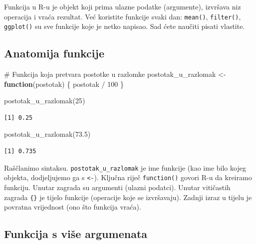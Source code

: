 \documentclass[
  croatian,
  letterpaper,
  DIV=11,
  numbers=noendperiod]{scrartcl}
\newenvironment{Shaded}{\begin{snugshade}}{\end{snugshade}}
\newcommand{\CommentTok}[1]{\textcolor[rgb]{0.37,0.37,0.37}{#1}}
\newcommand{\ControlFlowTok}[1]{\textcolor[rgb]{0.00,0.23,0.31}{\textbf{#1}}}
\newcommand{\DecValTok}[1]{\textcolor[rgb]{0.68,0.00,0.00}{#1}}
\newcommand{\FloatTok}[1]{\textcolor[rgb]{0.68,0.00,0.00}{#1}}
\newcommand{\FunctionTok}[1]{\textcolor[rgb]{0.28,0.35,0.67}{#1}}
\newcommand{\NormalTok}[1]{\textcolor[rgb]{0.00,0.23,0.31}{#1}}
\newcommand{\OtherTok}[1]{\textcolor[rgb]{0.00,0.23,0.31}{#1}}
\newcommand{\SpecialCharTok}[1]{\textcolor[rgb]{0.37,0.37,0.37}{#1}}
\begin{document}
Funkcija u R-u je objekt koji prima ulazne podatke (argumente), izvršava
niz operacija i vraća rezultat. Već koristite funkcije svaki dan:
\texttt{mean()}, \texttt{filter()}, \texttt{ggplot()} su sve funkcije
koje je netko napisao. Sad ćete naučiti pisati vlastite.

\subsection{Anatomija funkcije}\label{anatomija-funkcije}

\begin{Shaded}
\begin{Highlighting}[]
\CommentTok{\# Funkcija koja pretvara postotke u razlomke}
\NormalTok{postotak\_u\_razlomak }\OtherTok{\textless{}{-}} \ControlFlowTok{function}\NormalTok{(postotak) \{}
\NormalTok{  postotak }\SpecialCharTok{/} \DecValTok{100}
\NormalTok{\}}

\FunctionTok{postotak\_u\_razlomak}\NormalTok{(}\DecValTok{25}\NormalTok{)}
\end{Highlighting}
\end{Shaded}

\begin{verbatim}
[1] 0.25
\end{verbatim}

\begin{Shaded}
\begin{Highlighting}[]
\FunctionTok{postotak\_u\_razlomak}\NormalTok{(}\FloatTok{73.5}\NormalTok{)}
\end{Highlighting}
\end{Shaded}

\begin{verbatim}
[1] 0.735
\end{verbatim}

Raščlanimo sintaksu. \texttt{postotak\_u\_razlomak} je ime funkcije (kao
ime bilo kojeg objekta, dodjeljujemo ga s \texttt{\textless{}-}).
Ključna riječ \texttt{function()} govori R-u da kreiramo funkciju.
Unutar zagrada su argumenti (ulazni podatci). Unutar vitičastih zagrada
\texttt{\{\}} je tijelo funkcije (operacije koje se izvršavaju). Zadnji
izraz u tijelu je povratna vrijednost (ono što funkcija vraća).

\subsection{Funkcija s više
argumenata}\label{funkcija-s-viux161e-argumenata}
\end{document}
